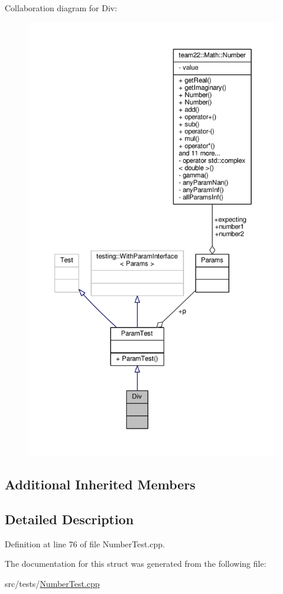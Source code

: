 Collaboration diagram for Div\+:
\nopagebreak
\begin{figure}[H]
\begin{center}
\leavevmode
\includegraphics[height=550pt]{struct_div__coll__graph}
\end{center}
\end{figure}
\subsection*{Additional Inherited Members}


\subsection{Detailed Description}


Definition at line 76 of file Number\+Test.\+cpp.



The documentation for this struct was generated from the following file\+:\begin{DoxyCompactItemize}
\item 
src/tests/\hyperlink{_number_test_8cpp}{Number\+Test.\+cpp}\end{DoxyCompactItemize}
